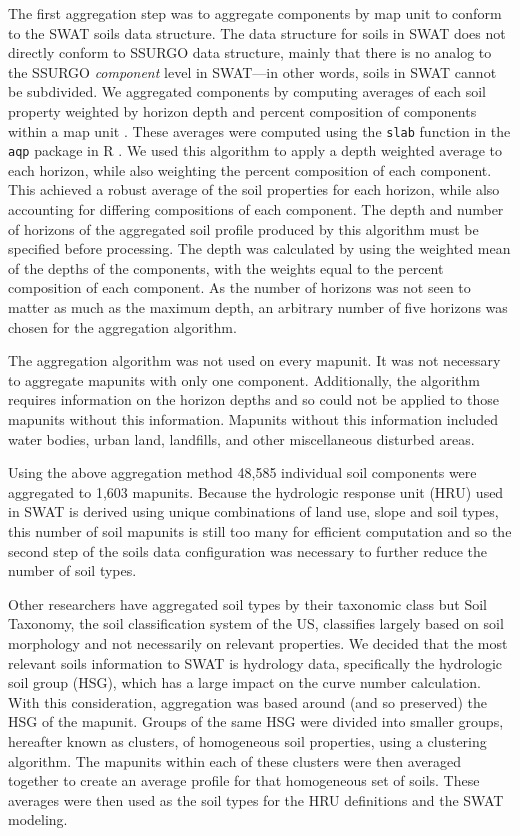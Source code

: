 The first aggregation step was to aggregate components by map unit to conform to the SWAT soils data structure. The data structure for soils in SWAT does not directly conform to SSURGO data structure, mainly that there is no analog to the SSURGO \textit{component} level in SWAT---in other words, soils in SWAT cannot be subdivided. We aggregated components by computing averages of each soil property weighted by horizon depth and percent composition of components within a map unit \cite{gatzke_aggregation_2011, beaudette_algorithms_2013}. These averages were computed using the \texttt{slab} function in the \texttt{aqp} package in R \cite{beaudette_algorithms_2013}. We used this algorithm to apply a depth weighted average to each horizon, while also weighting the percent composition of each component. This achieved a robust average of the soil properties for each horizon, while also accounting for differing compositions of each component. The depth and number of horizons of the aggregated soil profile produced by this algorithm must be specified before processing. The depth was calculated by using the weighted mean of the depths of the components, with the weights equal to the percent composition of each component. As the number of horizons was not seen to matter as much as the maximum depth, an arbitrary number of five horizons was chosen for the aggregation algorithm. 

The aggregation algorithm was not used on every mapunit. It was not necessary to aggregate mapunits with only one component. Additionally, the algorithm requires information on the horizon depths and so could not be applied to those mapunits without this information. Mapunits without this information included water bodies, urban land, landfills, and other miscellaneous disturbed areas. 

Using the above aggregation method 48,585 individual soil components were aggregated to 1,603 mapunits. Because the hydrologic response unit (HRU) used in SWAT	is derived using unique combinations of land use, slope and soil types, this number of soil mapunits is still too many for efficient computation  and so the second step of the soils data configuration was necessary to further reduce the number of soil types. %

Other researchers have aggregated soil types by their taxonomic class \citep{gatzke_aggregation_2011} but Soil Taxonomy, the soil classification system of the US, classifies largely based on soil morphology and not necessarily on relevant properties. We decided that the most relevant soils information to SWAT is hydrology data, specifically the hydrologic soil group (HSG), which has a large impact on the curve number calculation. With this consideration, aggregation was based around (and so preserved) the HSG of the mapunit. Groups of the same HSG were divided into smaller groups, hereafter known as clusters, of homogeneous soil properties, using a clustering algorithm. The mapunits within each of these clusters were then averaged together to create an average profile for that homogeneous set of soils. These averages were then used as the soil types for the HRU definitions and the SWAT modeling.

